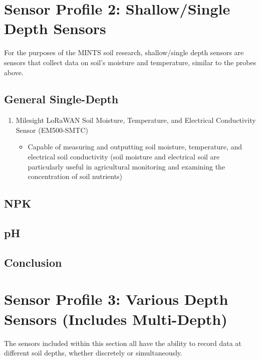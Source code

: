 \documentclass{article}
\begin{document}
\section{Sensor Profile 2: Shallow/Single Depth Sensors}
For the purposes of the MINTS soil research, shallow/single depth sensors are sensors that collect data on soil's moisture and temperature, similar to the probes above.  %

\subsection{General Single-Depth}
\begin{enumerate}
\item Milesight LoRaWAN Soil Moisture, Temperature, and Electrical Conductivity Sensor (EM500-SMTC)
\begin{itemize}
\item Capable of measuring and outputting soil moisture, temperature, and electrical soil conductivity (soil moisture and electrical soil are particularly useful in agricultural monitoring and examining the concentration of soil nutrients)
\end{itemize}
\end{enumerate}

\subsection{NPK}

\subsection{pH}

\subsection{Conclusion}

\section{Sensor Profile 3: Various Depth Sensors (Includes Multi-Depth)}
The sensors included within this section all have the ability to record data at different soil depths, whether discretely or simultaneously.
\end{document}
